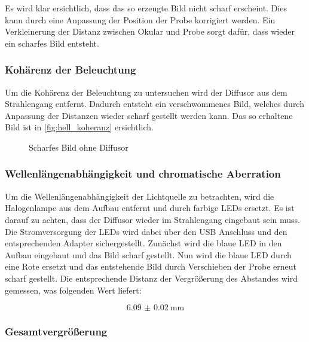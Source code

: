 \documentclass[12pt,english,ngerman]{scrartcl}
\begin{document}
Es wird klar ersichtlich, dass das so erzeugte Bild nicht scharf erscheint.
Dies kann durch eine Anpassung der Position der Probe korrigiert werden. Ein
Verkleinerung der Distanz zwischen Okular und Probe sorgt dafür, dass wieder
ein scharfes Bild entsteht.

\subsubsection{Kohärenz der Beleuchtung}

Um die Kohärenz der Beleuchtung zu untersuchen wird der Diffusor aus dem
Strahlengang entfernt. Dadurch entsteht ein verschwommenes Bild, welches durch
Anpassung der Distanzen wieder scharf gestellt werden kann. Das so erhaltene
Bild ist in \autoref{fig:hell_koheranz} ersichtlich.

\begin{figure}[H]
	\begin{center}
	\end{center}
	\caption[Scharfes Bild ohne Diffusor] { Scharfes Bild ohne Diffusor
	}\label{fig:hell_koheranz}
\end{figure}

\subsubsection{Wellenlängenabhängigkeit und chromatische Aberration}

Um die Wellenlängenabhängigkeit der Lichtquelle zu betrachten, wird die
Halogenlampe aus dem Aufbau entfernt und durch farbige LEDs ersetzt. Es ist
darauf zu achten, dass der Diffusor wieder im Strahlengang eingebaut sein muss.
Die Stromversorgung der LEDs wird dabei über den USB Anschluss und den
entsprechenden Adapter sichergestellt. Zunächst wird die blaue LED in den
Aufbau eingebaut und das Bild scharf gestellt. Nun wird die blaue LED durch
eine Rote ersetzt und das entstehende Bild durch Verschieben der Probe erneut
scharf gestellt. Die entsprechende Distanz der Vergrößerung des Abstandes wird
gemessen, was folgenden Wert liefert:

\begin{equation*}
	\SI{6.09(2)}{\mm}
\end{equation*}

\subsubsection{Gesamtvergrößerung}
\end{document}

